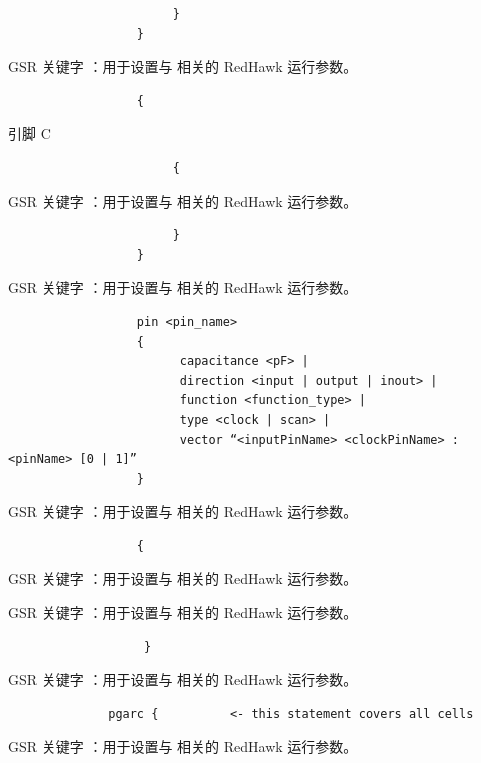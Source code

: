 \begin{lstlisting}
                       }
                  }
\end{lstlisting}

GSR 关键字 ：用于设置与  相关的 RedHawk 运行参数。

\begin{lstlisting}
                  {
\end{lstlisting}

引脚 C

\begin{lstlisting}
                       {
\end{lstlisting}

GSR 关键字 ：用于设置与  相关的 RedHawk 运行参数。

\begin{lstlisting}
                       }
                  }
\end{lstlisting}

GSR 关键字 ：用于设置与  相关的 RedHawk 运行参数。

\begin{lstlisting}
                  pin <pin_name>
                  {
                        capacitance <pF> |
                        direction <input | output | inout> |
                        function <function_type> |
                        type <clock | scan> |
                        vector “<inputPinName> <clockPinName> : <pinName> [0 | 1]”
                  }
\end{lstlisting}

GSR 关键字 ：用于设置与  相关的 RedHawk 运行参数。

\begin{lstlisting}
                  {
\end{lstlisting}

GSR 关键字 ：用于设置与  相关的 RedHawk 运行参数。

GSR 关键字 ：用于设置与  相关的 RedHawk 运行参数。

\begin{lstlisting}
                   }
\end{lstlisting}

GSR 关键字 ：用于设置与  相关的 RedHawk 运行参数。

\begin{lstlisting}
              pgarc {          <- this statement covers all cells
\end{lstlisting}

GSR 关键字 ：用于设置与  相关的 RedHawk 运行参数。

